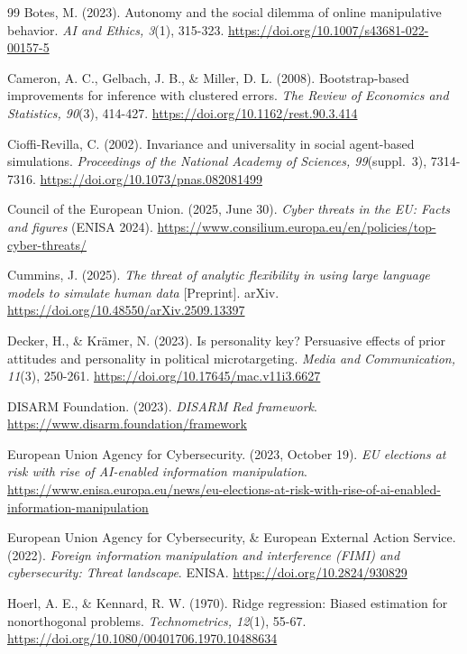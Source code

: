 \documentclass[11pt,a4paper]{article}
\newcommand{\doiurl}[1]{\href{https://doi.org/#1}{https://doi.org/#1}}
\begin{document}
\begin{thebibliography}{99}
Botes, M. (2023). Autonomy and the social dilemma of online manipulative behavior. \textit{AI and
Ethics, 3}(1), 315-323. \doiurl{10.1007/s43681-022-00157-5}

Cameron, A. C., Gelbach, J. B., \& Miller, D. L. (2008). Bootstrap-based improvements for inference
with clustered errors. \textit{The Review of Economics and Statistics, 90}(3), 414-427.
\doiurl{10.1162/rest.90.3.414}

Cioffi-Revilla, C. (2002). Invariance and universality in social agent-based simulations.
\textit{Proceedings of the National Academy of Sciences, 99}(suppl.\ 3), 7314-7316.
\doiurl{10.1073/pnas.082081499}

Council of the European Union. (2025, June 30). \textit{Cyber threats in the EU: Facts and figures}
(ENISA 2024). \url{https://www.consilium.europa.eu/en/policies/top-cyber-threats/}

Cummins, J. (2025). \textit{The threat of analytic flexibility in using large language models to
simulate human data} [Preprint]. arXiv. \doiurl{10.48550/arXiv.2509.13397}

Decker, H., \& Kr\"amer, N. (2023). Is personality key? Persuasive effects of prior attitudes and
personality in political microtargeting. \textit{Media and Communication, 11}(3), 250-261.
\doiurl{10.17645/mac.v11i3.6627}

DISARM Foundation. (2023). \textit{DISARM Red framework}.
\url{https://www.disarm.foundation/framework}

European Union Agency for Cybersecurity. (2023, October 19). \textit{EU elections at risk with rise
of AI-enabled information manipulation}.
\url{https://www.enisa.europa.eu/news/eu-elections-at-risk-with-rise-of-ai-enabled-information-manipulation}

European Union Agency for Cybersecurity, \& European External Action Service. (2022).
\textit{Foreign information manipulation and interference (FIMI) and cybersecurity: Threat
landscape}. ENISA. \doiurl{10.2824/930829}

Hoerl, A. E., \& Kennard, R. W. (1970). Ridge regression: Biased estimation for nonorthogonal
problems. \textit{Technometrics, 12}(1), 55-67. \doiurl{10.1080/00401706.1970.10488634}


\end{thebibliography}
\end{document}
